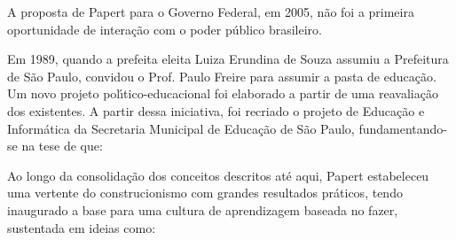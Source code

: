 \documentclass[
12pt,		%
openright,	%
twoside,  %
a4paper,			%
chapter=TITLE,		%
english,			%
french,				%
spanish,			%
brazil				%
]{USPSC-classe/USPSC}
\begin{document}
A proposta de Papert para o Governo Federal, em 2005, n\~ao foi a primeira oportunidade de intera\c{c}\~ao com o poder p\'ublico brasileiro.

















Em 1989, quando a prefeita eleita Luiza Erundina de Souza assumiu a Prefeitura de S\~ao Paulo, convidou o Prof. Paulo Freire para assumir a pasta de educa\c{c}\~ao. Um novo projeto pol\'{\i}tico-educacional foi elaborado a partir de uma reavalia\c{c}\~ao dos existentes. A partir dessa iniciativa, foi recriado o projeto de Educa\c{c}\~ao e Inform\'atica da Secretaria Municipal de Educa\c{c}\~ao de S\~ao Paulo, fundamentando-se na tese de que:


















\noindent\begin{center}\mbox{\centering{}}\end{center}


Ao longo da consolida\c{c}\~ao dos conceitos descritos at\'e aqui, Papert estabeleceu uma vertente do construcionismo com grandes resultados pr\'aticos, tendo inaugurado a base para uma cultura de aprendizagem baseada no \textquotedbl fazer\textquotedbl , sustentada em ideias como:
\end{document}
